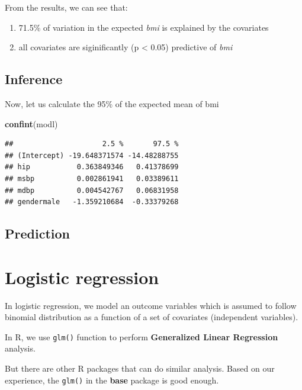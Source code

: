\documentclass[]{book}
\newenvironment{Shaded}{\begin{snugshade}}{\end{snugshade}}
\newcommand{\KeywordTok}[1]{\textcolor[rgb]{0.13,0.29,0.53}{\textbf{#1}}}
\newcommand{\NormalTok}[1]{#1}
\providecommand{\tightlist}{%
  \setlength{\itemsep}{0pt}\setlength{\parskip}{0pt}}
\theoremstyle{definition}
\theoremstyle{definition}
\theoremstyle{remark}
\begin{document}
From the results, we can see that:

\begin{enumerate}
\def\labelenumi{\arabic{enumi}.}
\tightlist
\item
  71.5\% of variation in the expected \emph{bmi} is explained by the
  covariates
\item
  all covariates are siginificantly (p \textless{} 0.05) predictive of
  \emph{bmi}
\end{enumerate}

\subsection{Inference}\label{inference}

Now, let us calculate the 95\% of the expected mean of bmi

\begin{Shaded}
\begin{Highlighting}[]
\KeywordTok{confint}\NormalTok{(modl)}
\end{Highlighting}
\end{Shaded}

\begin{verbatim}
##                     2.5 %       97.5 %
## (Intercept) -19.648371574 -14.48288755
## hip           0.363849346   0.41378699
## msbp          0.002861941   0.03389611
## mdbp          0.004542767   0.06831958
## gendermale   -1.359210684  -0.33379268
\end{verbatim}

\subsection{Prediction}\label{prediction}

\section{Logistic regression}\label{logistic-regression}

In logistic regression, we model an outcome variables which is assumed
to follow binomial distribution as a function of a set of covariates
(independent variables).

In R, we use \texttt{glm()} function to perform \textbf{Generalized
Linear Regression} analysis.

But there are other R packages that can do similar analysis. Based on
our experience, the \texttt{glm()} in the \textbf{base} package is good
enough.
\end{document}
